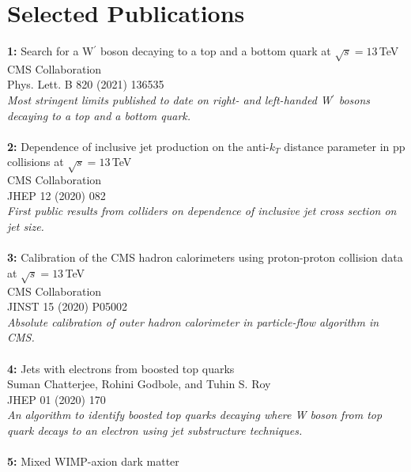 \documentclass[a4paper,11pt]{article}
\begin{document}
\newpage

\section*{{Selected Publications}}

\textbf{1:} {
Search for a W$^\prime$ boson decaying to a top and a bottom quark at $\sqrt{s}=13$\,TeV}\\
CMS Collaboration \\
Phys. Lett. B 820 (2021) 136535 \\
\textit{Most stringent limits published to date on right- and left-handed W$^\prime$ bosons decaying to a top and a bottom quark.}\\
\\
\textbf{2:} {
Dependence of inclusive jet production on the anti$\mbox{-}k_T$ distance parameter in pp collisions at $\sqrt{s} = 13$\,TeV}\\
CMS Collaboration \\
JHEP 12 (2020) 082\\
\textit{First public results from colliders on dependence of inclusive jet cross section on jet size.}\\
\\
\textbf{3:} {Calibration of the CMS hadron calorimeters using proton-proton collision data at $\sqrt{s}= 13$\,TeV}\\
CMS Collaboration \\
JINST 15 (2020) P05002\\
\textit{Absolute calibration of outer hadron calorimeter in particle-flow algorithm in CMS.}\\
\\
\textbf{4:} {Jets with electrons from boosted top quarks}\\
Suman Chatterjee, Rohini Godbole, and Tuhin S. Roy\\
JHEP 01 (2020) 170\\
\textit{An algorithm to identify boosted top quarks decaying where W boson from top quark decays to an electron using jet substructure techniques.}\\
\\
\textbf{5:} {Mixed WIMP-axion dark matter}\\
\end{document}
